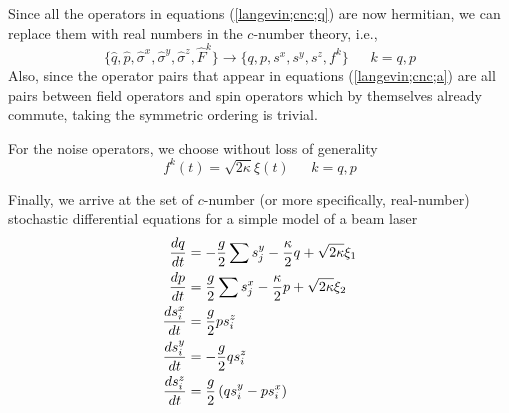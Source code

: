 \documentclass{article}
\begin{document}
Since all the operators in equations (\ref{langevin;cnc;q}) are now hermitian, we can replace them with real numbers in the $c$-number theory, i.e., 
\begin{equation}
    \{ \hat{q}, \hat{p}, \hat{\sigma}^x, \hat{\sigma}^y, \hat{\sigma}^z, \hat{F}^k\} \longrightarrow \{q, p, s^x, s^y, s^z, f^k\}\ \ \ \ \ \ \  k=q,p
\end{equation}
Also, since the operator pairs that appear in equations (\ref{langevin;cnc;a}) are all pairs between field operators and spin operators which by themselves already commute, taking the symmetric ordering is trivial.

For the noise operators, we choose without loss of generality
\begin{equation}
    f^k(t) = \sqrt{2\kappa} \xi(t)\ \ \ \ \ \ \  k=q,p
\end{equation}

Finally, we arrive at the set of $c$-number (or more specifically, real-number) stochastic differential equations for a simple model of a beam laser
\begin{align}
    \notag \frac{dq}{dt} &= -\frac{g}{2}\sum s_j^y-\frac{\kappa}{2}q+\sqrt{2\kappa}\xi_1\\
    \notag \frac{dp}{dt} &= \frac{g}{2}\sum s_j^x-\frac{\kappa}{2}p+\sqrt{2\kappa}\xi_2\\
    \label{langevin;cnc}
    \frac{d s_i^x}{dt} &= \frac{g}{2} p s^z_i\\
    \notag \frac{d s_i^y}{dt} &= -\frac{g}{2}q s^z_i\\
    \notag \frac{d s_i^z}{dt} &= \frac{g}{2}\left(q s^y_i-p s_i^x\right)
\end{align}
\end{document}
